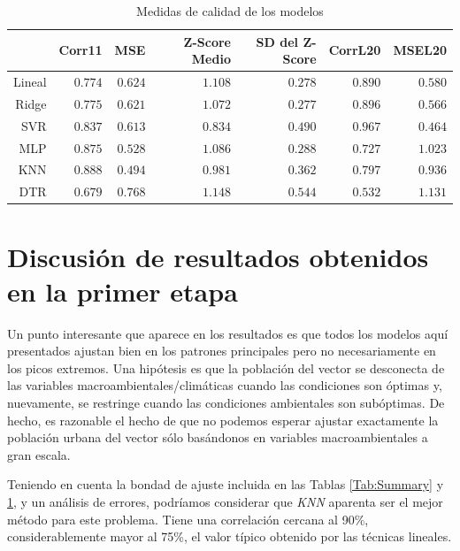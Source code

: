   \begin{table}[hbt]
  \centering
  \caption{Medidas de calidad de los modelos}\label{Tab:Quality}
  \begin{tabular}{*7{r}}
  \toprule
  & Corr11
  & MSE
  & Z-Score Medio
  & SD del Z-Score
  & CorrL20
  & MSEL20 \\ \midrule
  Lineal
  &$0.774$
  &$0.624$
  &$1.108$%
  &$0.278$
  &$0.890$
  &$0.580$\\
  Ridge
  &$0.775$
  &$0.621$
  &$1.072$
  &$0.277$
  &$0.896$
  &$0.566$ \\
  SVR
  &$0.837$
  &$0.613$
  &\boldmath$0.834$   %
  &$0.490$
  &\boldmath$0.967$
  &\boldmath$0.464$ \\
  MLP
  &$0.875$
  &$0.528$
  &$1.086$
  &$0.288$
  &$0.727$
  &$1.023$ \\
  KNN
  &\boldmath$0.888$
  &\boldmath$0.494$
  &$0.981$
  &$0.362$
  &$0.797$
  &$0.936$\\
  DTR
  &$0.679$
  &$0.768$
  &$1.148$
  &$0.544$
  &$0.532$
  &$1.131$ \\
  \bottomrule
  \end{tabular}
  \end{table}

  \section{Discusión de resultados obtenidos en la primer etapa}

    \par Un punto interesante que aparece en los resultados es que todos los
      modelos aquí presentados ajustan bien en los patrones principales
      pero no necesariamente en los picos extremos. Una hipótesis es que la población
      del vector se desconecta de las variables macroambientales/climáticas
      cuando las condiciones son óptimas y, nuevamente, se restringe cuando las
      condiciones ambientales son subóptimas. De hecho, es razonable el hecho de
      que no podemos esperar ajustar exactamente la población urbana del vector
      sólo basándonos en variables macroambientales a gran escala.


    \par Teniendo en cuenta la bondad de ajuste incluida en las Tablas
      \ref{Tab:Summary} y \ref{Tab:Quality}, y un análisis de errores, podríamos
      considerar que \textit{KNN} aparenta ser el mejor método para este problema.
      Tiene una correlación cercana al 90\%, considerablemente mayor al
      75\%, el valor típico obtenido por las técnicas lineales.

